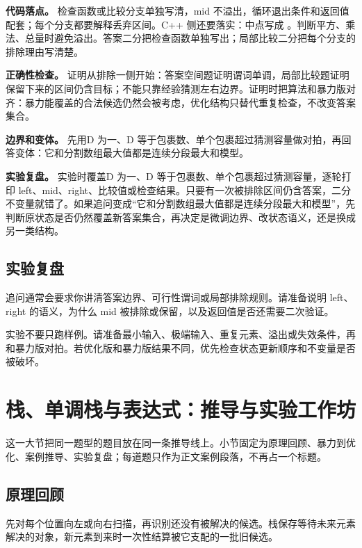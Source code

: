 \textbf{代码落点。} 检查函数或比较分支单独写清，mid 不溢出，循环退出条件和返回值配套；每个分支都要解释丢弃区间。C++ 侧还要落实：中点写成 。判断平方、乘法、总量时避免溢出。答案二分把检查函数单独写出；局部比较二分把每个分支的排除理由写清楚。

\textbf{正确性检查。} 证明从排除一侧开始：答案空间题证明谓词单调，局部比较题证明保留下来的区间仍含目标；不能只靠经验猜测左右边界。证明时把算法和暴力版对齐：暴力能覆盖的合法候选仍然会被考虑，优化结构只替代重复检查，不改变答案集合。

\textbf{边界和变体。} 先用D 为一、D 等于包裹数、单个包裹超过猜测容量做对拍，再回答变体：它和分割数组最大值都是连续分段最大和模型。

\textbf{实验复盘。} 实验时覆盖D 为一、D 等于包裹数、单个包裹超过猜测容量，逐轮打印 left、mid、right、比较值或检查结果。只要有一次被排除区间仍含答案，二分不变量就错了。如果追问变成“它和分割数组最大值都是连续分段最大和模型”，先判断原状态是否仍然覆盖新答案集合，再决定是微调边界、改状态语义，还是换成另一类结构。

\subsection{实验复盘}

追问通常会要求你讲清答案边界、可行性谓词或局部排除规则。请准备说明 left、right 的语义，为什么 mid 被排除或保留，以及返回值是否还需要二次验证。

实验不要只跑样例。请准备最小输入、极端输入、重复元素、溢出或失效条件，再和暴力版对拍。若优化版和暴力版结果不同，优先检查状态更新顺序和不变量是否被破坏。

\section{栈、单调栈与表达式：推导与实验工作坊}
这一大节把同一题型的题目放在同一条推导线上。小节固定为原理回顾、暴力到优化、案例推导、实验复盘；每道题只作为正文案例段落，不再占一个标题。

\subsection{原理回顾}

先对每个位置向左或向右扫描，再识别还没有被解决的候选。栈保存等待未来元素解决的对象，新元素到来时一次性结算被它支配的一批旧候选。

